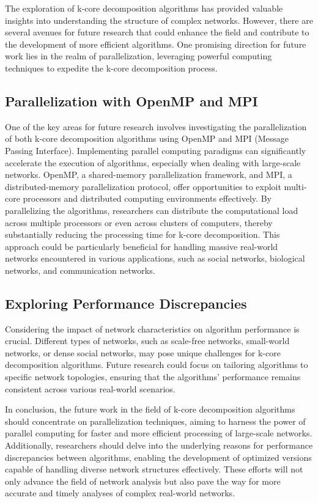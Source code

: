 The exploration of k-core decomposition algorithms has provided valuable insights into understanding the structure of complex networks. However, there are several avenues for future research that could enhance the field and contribute to the development of more efficient algorithms. One promising direction for future work lies in the realm of parallelization, leveraging powerful computing techniques to expedite the k-core decomposition process.

\subsection{Parallelization with OpenMP and MPI}

One of the key areas for future research involves investigating the parallelization of both k-core decomposition algorithms using OpenMP and MPI (Message Passing Interface). Implementing parallel computing paradigms can significantly accelerate the execution of algorithms, especially when dealing with large-scale networks. OpenMP, a shared-memory parallelization framework, and MPI, a distributed-memory parallelization protocol, offer opportunities to exploit multi-core processors and distributed computing environments effectively. By parallelizing the algorithms, researchers can distribute the computational load across multiple processors or even across clusters of computers, thereby substantially reducing the processing time for k-core decomposition. This approach could be particularly beneficial for handling massive real-world networks encountered in various applications, such as social networks, biological networks, and communication networks.


\subsection{Exploring Performance Discrepancies}


Considering the impact of network characteristics on algorithm performance is crucial. Different types of networks, such as scale-free networks, small-world networks, or dense social networks, may pose unique challenges for k-core decomposition algorithms. Future research could focus on tailoring algorithms to specific network topologies, ensuring that the algorithms' performance remains consistent across various real-world scenarios.

In conclusion, the future work in the field of k-core decomposition algorithms should concentrate on parallelization techniques, aiming to harness the power of parallel computing for faster and more efficient processing of large-scale networks. Additionally, researchers should delve into the underlying reasons for performance discrepancies between algorithms, enabling the development of optimized versions capable of handling diverse network structures effectively. These efforts will not only advance the field of network analysis but also pave the way for more accurate and timely analyses of complex real-world networks.
